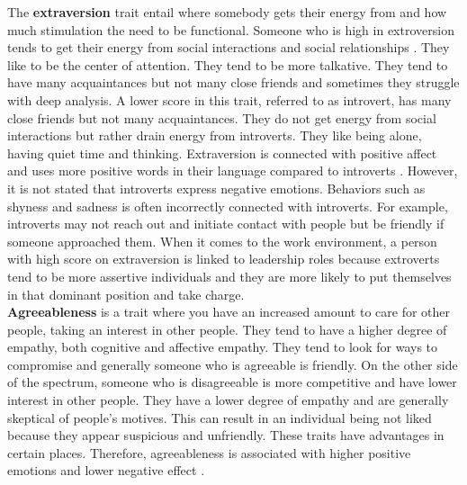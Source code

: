 The \textbf{extraversion} trait entail where somebody gets their energy from and how much stimulation the need to be functional. Someone who is high in extroversion tends to get their energy from social interactions and social relationships \cite{big-five-john1999big}. They like to be the center of attention. They tend to be more talkative. They tend to have many acquaintances but not many close friends and sometimes they struggle with deep analysis. A lower score in this trait, referred to as introvert, has many close friends but not many acquaintances. They do not get energy from social interactions but rather drain energy from introverts. They like being alone, having quiet time and thinking. Extraversion is connected with positive affect and uses more positive words in their language compared to introverts \cite{extraversion1-komulainen2014effect} \cite{extraversion2-pennebaker1999linguistic}. However, it is not stated that introverts express negative emotions. Behaviors such as shyness and sadness is often incorrectly connected with introverts. For example, introverts may not reach out and initiate contact with people but be friendly if someone approached them. When it comes to the work environment, a person with high score on extraversion is linked to leadership roles because extroverts tend to be more assertive individuals and they are more likely to put themselves in that dominant position and take charge.  \\

\textbf{Agreeableness} is a trait where you have an increased amount to care for other people, taking an interest in other people. They tend to have a higher degree of empathy, both cognitive and affective empathy. They tend to look for ways to compromise and generally someone who is agreeable is friendly. On the other side of the spectrum, someone who is disagreeable is more competitive and have lower interest in other people. They have a lower degree of empathy and are generally skeptical of people's motives. This can result in an individual being not liked because they appear suspicious and unfriendly. These traits have advantages in certain places. Therefore, agreeableness is associated with higher positive emotions and lower negative effect \cite{personality_emotions_link}. \\

